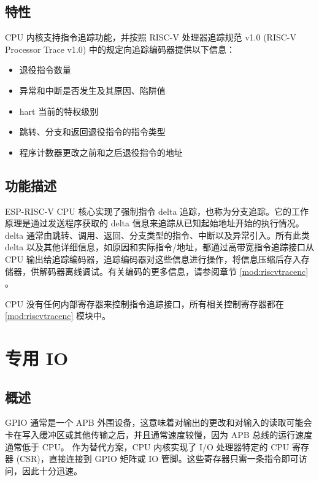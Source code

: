 \documentclass[main\_\_CN.tex]{subfiles}
\begin{document}
\subsection{特性}
\label{sec:riscvcpu-trace-features}

CPU 内核支持指令追踪功能，并按照 RISC-V 处理器追踪规范 v1.0 (RISC-V Processor Trace v1.0) 中的规定向追踪编码器提供以下信息：

\begin{itemize}
    \item 退役指令数量
    \item 异常和中断是否发生及其原因、陷阱值
    \item hart 当前的特权级别
    \item 跳转、分支和返回退役指令的指令类型
    \item 程序计数器更改之前和之后退役指令的地址
\end{itemize}

\subsection{功能描述}
\label{sec:riscvcpu-trace-func-descr}

ESP-RISC-V CPU 核心实现了强制指令 delta 追踪，也称为分支追踪。它的工作原理是通过发送程序获取的 delta 信息来追踪从已知起始地址开始的执行情况。delta 通常由跳转、调用、返回、分支类型的指令、中断以及异常引入。所有此类 delta 以及其他详细信息，如原因和实际指令/地址，都通过高带宽指令追踪接口从 CPU 输出给追踪编码器，追踪编码器对这些信息进行操作，将信息压缩后存入存储器，供解码器离线调试。有关编码的更多信息，请参阅章节 \ref{mod:riscvtracenc} \textit{}。

CPU 没有任何内部寄存器来控制指令追踪接口，所有相关控制寄存器都在 \ref{mod:riscvtracenc} \textit{} 模块中。

\clearpage
\section{专用 IO}
\label{sec:riscvcpu-fastio}

\subsection{概述}
\label{sec:riscvcpu-fastio-overview}

GPIO 通常是一个 APB 外围设备，这意味着对输出的更改和对输入的读取可能会卡在写入缓冲区或其他传输之后，并且通常速度较慢，因为 APB 总线的运行速度通常低于 CPU。
作为替代方案，CPU 内核实现了 I/O 处理器特定的 CPU 寄存器 (CSR)，直接连接到 GPIO 矩阵或 IO 管脚。这些寄存器只需一条指令即可访问，因此十分迅速。
\end{document}
